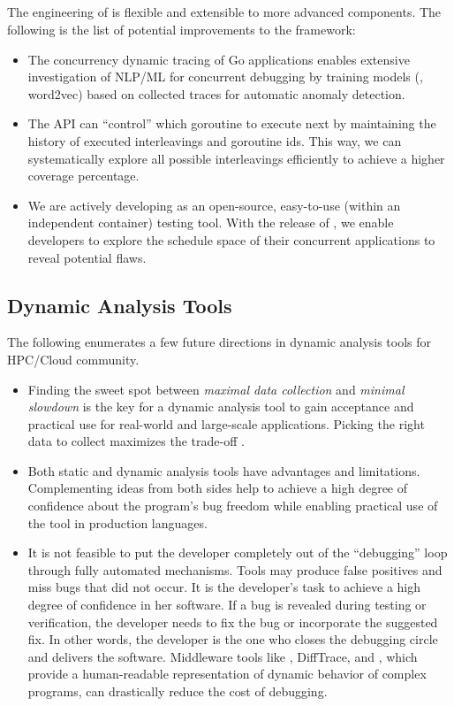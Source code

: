 \subsection{\goat}
The engineering of \goat is flexible and extensible to more advanced components. The following is the list of potential improvements to the framework:
\begin{itemize}
  \item The concurrency dynamic tracing of Go applications enables extensive investigation of NLP/ML for concurrent debugging by training models (\eg, word2vec) based on collected traces for automatic anomaly detection.
  \item The \goat API can ``control'' which goroutine to execute next by maintaining the history of executed interleavings and goroutine ids. This way, we can systematically explore all possible interleavings efficiently to achieve a higher coverage percentage.
  \item We are actively developing \goat as an open-source, easy-to-use (within an independent container) testing tool. With the release of \goat, we enable developers to explore the schedule space of their concurrent applications to reveal potential flaws.
\end{itemize}
\subsection{Dynamic Analysis Tools}
The following enumerates a few future directions in dynamic analysis tools for HPC/Cloud community.
\begin{itemize}
  \item Finding the sweet spot between \textit{maximal data collection} and \textit{minimal slowdown} is the key for a dynamic analysis tool to gain acceptance and practical use for real-world and large-scale applications. Picking the right data to collect maximizes the trade-off \cite{saeed-gpu-irregularKernels}.
  \item Both static and dynamic analysis tools have advantages and limitations. Complementing ideas from both sides help to achieve a high degree of confidence about the program's bug freedom while enabling practical use of the tool in production languages.
  \item It is not feasible to put the developer completely out of the ``debugging'' loop through fully automated mechanisms. Tools may produce false positives and miss bugs that did not occur. It is the developer's task to achieve a high degree of confidence in her software. If a bug is revealed during testing or verification, the developer needs to fix the bug or incorporate the suggested fix. In other words, the developer is the one who closes the debugging circle and delivers the software. Middleware tools like \parlot, DiffTrace, and \goat, which provide a human-readable representation of dynamic behavior of complex programs, can drastically reduce the cost of debugging.
\end{itemize}
